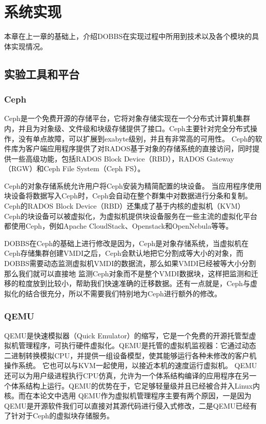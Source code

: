 
\chapter{系统实现}
\label{chap:systemimpl}
本章在上一章的基础上，介绍DOBBS在实现过程中所用到技术以及各个模块的具体实现情况。

\section{实验工具和平台}
\subsection{Ceph}
Ceph是一个免费开源的存储平台，它将对象存储实现在一个分布式计算机集群内，并且为对象级、文件级和块级存储提供了接口。Ceph主要针对完全分布式操作，没有单点故障，可以扩展到exabyte级别，并且有非常高的可用性。
Ceph的软件库为客户端应用程序提供了对RADOS基于对象的存储系统的直接访问，同时提供一些高级功能，包括RADOS Block Device（RBD），RADOS Gateway（RGW）和Ceph File System（Ceph FS）。

Ceph的对象存储系统允许用户将Ceph安装为精简配置的块设备。 当应用程序使用块设备将数据写入Ceph时，Ceph会自动在整个群集中对数据进行分条和复制。 Ceph的RADOS Block Device（RBD）还集成了基于内核的虚拟机（KVM）
Ceph的块设备可以被虚拟化，为虚拟机提供块设备服务在一些主流的虚拟化平台都使用Ceph，例如Apache CloudStack、Openstack和OpenNebula\cite{milojivcic2011opennebula}等等。

DOBBS在Ceph的基础上进行修改是因为，Ceph是对象存储系统，当虚拟机在Ceph存储集群创建VMDI之后，Ceph会默认地把它分割成等大小的对象，而DOBBS需要动态监测虚拟机VMDI的数据流，那么如果VMDI已经被等大小分割那么我们就可以直接地
监测Ceph对象而不是整个VMDI数据块，这样把监测和迁移的粒度放到比较小，帮助我们快速准确的迁移数据。还有一点就是，Ceph与虚拟化的结合很充分，所以不需要我们特别地为Ceph进行额外的修改。

\subsection{QEMU}
QEMU\cite{bellard2005qemu}是快速模拟器（Quick Emulator）的缩写，它是一个免费的开源托管型虚拟机管理程序，可执行硬件虚拟化。QEMU是托管的虚拟机监视器：它通过动态二进制转换模拟CPU，并提供一组设备模型，使其能够运行各种未修改的客户机操作系统。 
它也可以与KVM\cite{kivity2007kvm}一起使用，以接近本机的速度运行虚拟机。 QEMU还可以为用户级进程执行CPU仿真，允许为一个体系结构编译的应用程序在另一个体系结构上运行。QEMU的优势在于，它足够轻量级并且已经被合并入Linux内核。而在本论文中选用
QEMU作为虚拟机管理程序主要有两个原因，一是因为QEMU是开源软件我们可以直接对其源代码进行侵入式修改，二是QEMU已经有了针对于Ceph的虚拟块存储服务。

